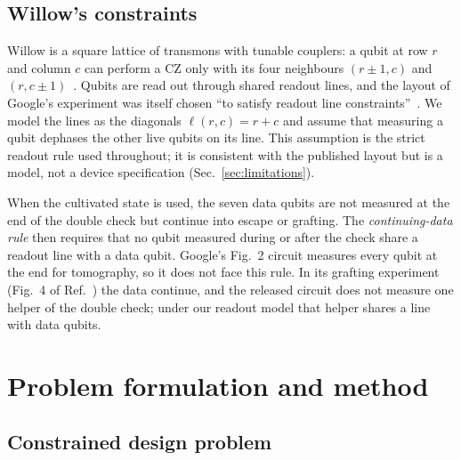 \documentclass[aps,pra,reprint,superscriptaddress,longbibliography]{revtex4-2}
\begin{document}
\subsection{Willow's constraints}
\label{sec:constraints}

Willow is a square lattice of transmons with tunable couplers: a qubit at row $r$ and column $c$ can perform a CZ only with its four neighbours $(r\pm1,c)$ and $(r,c\pm1)$~\cite{GoogleBelowThreshold2025}.
Qubits are read out through shared readout lines, and the layout of Google's experiment was itself chosen ``to satisfy readout line constraints''~\cite{Rosenfeld2025}.
We model the lines as the diagonals $\ell(r,c)=r+c$ and assume that measuring a qubit dephases the other live qubits on its line.
This assumption is the strict readout rule used throughout; it is consistent with the published layout but is a model, not a device specification (Sec.~\ref{sec:limitations}).

When the cultivated state is used, the seven data qubits are not measured at the end of the double check but continue into escape or grafting.
The \emph{continuing-data rule} then requires that no qubit measured during or after the check share a readout line with a data qubit.
Google's Fig.~2 circuit measures every qubit at the end for tomography, so it does not face this rule.
In its grafting experiment (Fig.~4 of Ref.~\cite{Rosenfeld2025}) the data continue, and the released circuit does not measure one helper of the double check; under our readout model that helper shares a line with data qubits.

\section{Problem formulation and method}
\label{sec:model}

\subsection{Constrained design problem}
\end{document}
